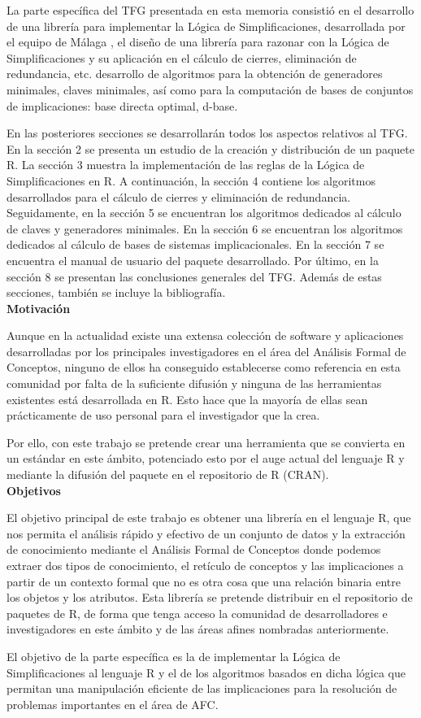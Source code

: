 La parte espec\'ifica del TFG presentada en esta memoria consisti\'o en el desarrollo de una librer\'ia para implementar la L\'ogica de Simplificaciones, desarrollada por el equipo de M\'alaga \cite{Cordero2002}, el dise\~no de una librer\'ia para razonar con la L\'ogica de Simplificaciones y su aplicaci\'on en el c\'alculo de cierres, eliminaci\'on de redundancia, etc. desarrollo de algoritmos para la obtenci\'on de generadores minimales, claves minimales, as\'i como para la computaci\'on de bases de conjuntos de implicaciones: base directa optimal, d-base. 

En las posteriores secciones se desarrollar\'an todos los aspectos relativos al TFG. En la secci\'on 2 se presenta un estudio de la creaci\'on y distribuci\'on de un paquete R. La secci\'on 3 muestra la implementaci\'on de las reglas de la L\'ogica de Simplificaciones en R. A continuaci\'on, la secci\'on 4 contiene los algoritmos desarrollados para el c\'alculo de cierres y eliminaci\'on de redundancia. Seguidamente, en la secci\'on 5 se encuentran los algoritmos dedicados al c\'alculo de claves y generadores minimales. En la secci\'on 6 se encuentran los algoritmos dedicados al c\'alculo de bases de sistemas implicacionales. En la secci\'on 7 se encuentra el manual de usuario del paquete desarrollado. Por \'ultimo, en la secci\'on 8 se presentan las conclusiones generales del TFG. Adem\'as de estas secciones, tambi\'en se incluye la bibliograf\'ia.\\

\textbf{Motivaci\'on}

Aunque en la actualidad existe una extensa colecci\'on de software y aplicaciones desarrolladas por los principales investigadores en el \'area del  An\'alisis Formal de Conceptos, ninguno de ellos ha conseguido establecerse como referencia en esta comunidad por falta de la suficiente difusi\'on y ninguna de las herramientas existentes est\'a desarrollada en R. Esto hace que la mayor\'ia de ellas sean pr\'acticamente de uso personal para el investigador que la crea. 

Por ello, con este trabajo se pretende crear una herramienta que se convierta en un est\'andar en este \'ambito, potenciado esto por el auge actual del lenguaje R y mediante la difusi\'on del paquete en el repositorio de R (CRAN).\\


\textbf{Objetivos}

El objetivo principal de este trabajo es obtener una librer\'ia en el lenguaje R, que nos permita el an\'alisis r\'apido y efectivo de un conjunto de datos y la extracci\'on de conocimiento mediante el An\'alisis Formal de Conceptos donde podemos extraer dos tipos de conocimiento, el ret\'iculo de conceptos y las implicaciones a partir de un contexto formal que no es otra cosa que una relaci\'on binaria entre los objetos y los atributos. Esta librer\'ia se pretende distribuir en el repositorio de paquetes de R, de forma que tenga acceso la comunidad de desarrolladores e investigadores en este \'ambito y de las \'areas afines nombradas anteriormente. 

El objetivo de la parte espec\'ifica es la de implementar la L\'ogica de Simplificaciones al lenguaje R y el de los algoritmos basados en dicha l\'ogica que permitan una manipulaci\'on eficiente de las implicaciones para la resoluci\'on de problemas importantes en el \'area de AFC.

\newpage